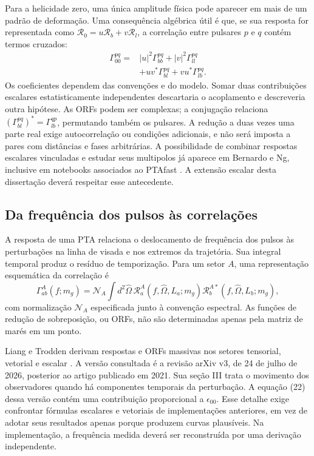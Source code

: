 Para a helicidade zero, uma única amplitude física pode aparecer em
mais de um padrão de deformação. Uma consequência algébrica útil é que,
se sua resposta for representada como
\(\mathcal R_0=u\mathcal R_b+v\mathcal R_l\), a correlação entre
pulsares \(p\) e \(q\) contém termos cruzados:
\begin{equation}
 \begin{aligned}
 \Gamma_{00}^{pq}={}&|u|^2\Gamma_{bb}^{pq}
                    +|v|^2\Gamma_{ll}^{pq}\\
                 &+uv^*\Gamma_{bl}^{pq}
                    +vu^*\Gamma_{lb}^{pq}.
 \end{aligned}
 \label{eq:rev-escalar-vinculado}
\end{equation}
Os coeficientes dependem das convenções e do modelo. Somar duas
contribuições escalares estatisticamente independentes descartaria o
acoplamento e descreveria outra hipótese. As ORFs podem ser complexas;
a conjugação relaciona \((\Gamma_{bl}^{pq})^*=\Gamma_{lb}^{qp}\),
permutando também os pulsares. A redução a duas vezes uma parte real
exige autocorrelação ou condições adicionais, e não será imposta a
pares com distâncias e fases arbitrárias. A possibilidade de combinar
respostas escalares vinculadas e estudar seus multipolos já aparece em
Bernardo e Ng, inclusive em notebooks associados ao PTAfast
\autocite{bernardo2024}. A extensão escalar desta dissertação deverá
respeitar esse antecedente.

\subsection{Da frequência dos pulsos às correlações}

A resposta de uma PTA relaciona o deslocamento de frequência dos
pulsos às perturbações na linha de visada e nos extremos da trajetória.
Sua integral temporal produz o resíduo de temporização. Para um setor
\(A\), uma representação esquemática da correlação é
\begin{equation}
 \Gamma_{ab}^{A}(f;m_g)=\mathcal N_A
 \int d^2\hat\Omega\,
 \mathcal R_a^{A}(f,\hat\Omega,L_a;m_g)
 \mathcal R_b^{A*}(f,\hat\Omega,L_b;m_g),
 \label{eq:rev-orf}
\end{equation}
com normalização \(\mathcal N_A\) especificada junto à convenção
espectral. As funções de redução de sobreposição, ou ORFs, não são
determinadas apenas pela matriz de marés em um ponto.

Liang e Trodden derivam respostas e ORFs massivas nos setores tensorial,
vetorial e escalar \autocite{liang2021}. A versão consultada é a revisão
arXiv v3, de 24 de julho de 2026, posterior ao artigo publicado em 2021.
Sua seção III trata o movimento dos observadores quando há componentes
temporais da perturbação. A equação (22) dessa versão contém uma
contribuição proporcional a \(\epsilon_{00}\). Esse detalhe exige
confrontar fórmulas escalares e vetoriais de implementações anteriores,
em vez de adotar seus resultados apenas porque produzem curvas
plausíveis. Na implementação, a frequência medida deverá ser
reconstruída por uma derivação independente.


